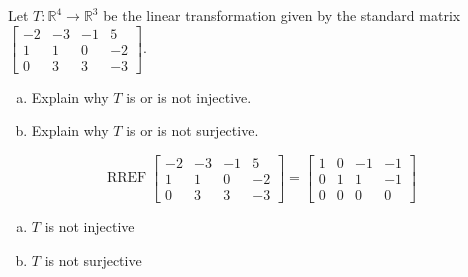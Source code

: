 
\begin{exerciseStatement}
 Let \(T:\mathbb{R}^ 4  \to \mathbb{R}^ 3 \) be the linear transformation given by the standard matrix \( \left[\begin{array}{cccc}
-2 & -3 & -1 & 5 \\
1 & 1 & 0 & -2 \\
0 & 3 & 3 & -3
\end{array}\right] .\)
\begin{enumerate}[(a)]
\item Explain why \(T\) is or is not injective.
\item Explain why \(T\) is or is not surjective.
\end{enumerate}
    
\end{exerciseStatement}
    
\begin{exerciseAnswer} 


\[\operatorname{RREF} \left[\begin{array}{cccc}
-2 & -3 & -1 & 5 \\
1 & 1 & 0 & -2 \\
0 & 3 & 3 & -3
\end{array}\right] = \left[\begin{array}{cccc}
1 & 0 & -1 & -1 \\
0 & 1 & 1 & -1 \\
0 & 0 & 0 & 0
\end{array}\right] \]


\begin{enumerate}[(a)]
\item \(T\) is not injective
\item \(T\) is not surjective
\end{enumerate}
    
\end{exerciseAnswer}
    
